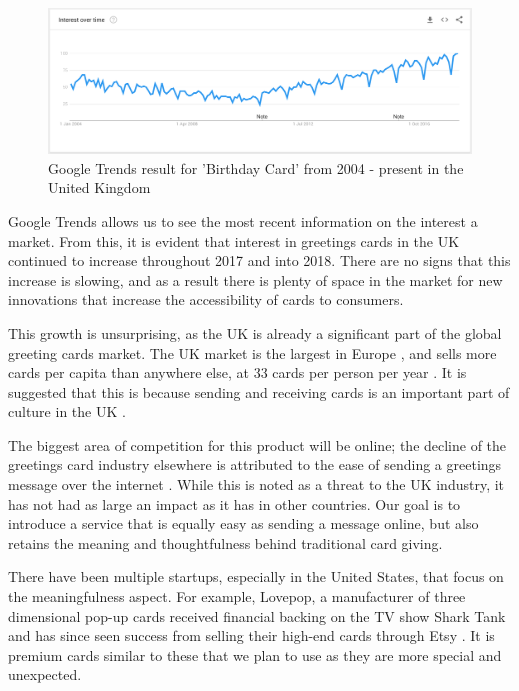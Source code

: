 \documentclass[10pt,a4paper]{article}
\begin{document}
  \begin{figure}
    \includegraphics[width=\textwidth]{birthday_cards_google_trends.png}
    \caption{Google Trends result for 'Birthday Card' from 2004 - present in the United Kingdom}
    \label{fig:google_trends}
  \end{figure}

Google Trends allows us to see the most recent information on the interest a market. From this, it is evident that interest in greetings cards in the UK continued to increase throughout 2017 and into 2018. There are no signs that this increase is slowing, and as a result there is plenty of space in the market for new innovations that increase the accessibility of cards to consumers.

This growth is unsurprising, as the UK is already a significant part of the global greeting cards market. The UK market is the largest in Europe \citep{strategyr}, and sells more cards per capita than anywhere else, at 33 cards per person per year \citep{greetingcardassociation}. It is suggested that this is because sending and receiving cards is an important part of culture in the UK \citep{greetingcardassociation}.

The biggest area of competition for this product will be online; the decline of the greetings card industry elsewhere is attributed to the ease of sending a greetings message over the internet \citep{npr}. While this is noted as a threat to the UK industry, it has not had as large an impact as it has in other countries\citep{mintel}. Our goal is to introduce a service that is equally easy as sending a message online, but also retains the meaning and thoughtfulness behind traditional card giving.

There have been multiple startups, especially in the United States, that focus on the meaningfulness aspect. For example, Lovepop, a manufacturer of three dimensional pop-up cards received financial backing on the TV show Shark Tank \citep{americaninno} and has since seen success from selling their high-end cards through Etsy \citep{Etsy}. It is premium cards similar to these that we plan to use as they are more special and unexpected.
\end{document}
